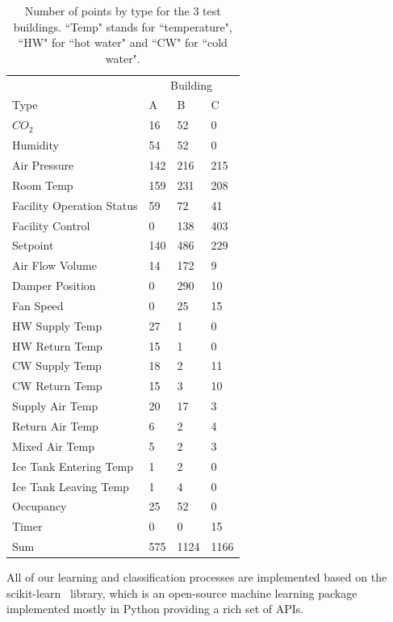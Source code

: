 \begin{table}[t]
\centering
\begin{tabular}{l | l l l}
\hline
& \multicolumn{3}{c}{Building} \\
Type & A & B & C\\
\hline\hline
$CO_{2}$ & 16 & 52 & 0\\
Humidity & 54 & 52 & 0\\
Air Pressure & 142 & 216 & 215\\
Room Temp & 159 & 231 & 208\\
Facility Operation Status & 59 & 72 & 41\\
Facility Control & 0 & 138 & 403\\
Setpoint & 140 & 486 & 229\\
Air Flow Volume & 14 & 172 & 9\\
Damper Position & 0 & 290 & 10\\
Fan Speed & 0 & 25 & 15\\
HW Supply Temp & 27 & 1 & 0\\
HW Return Temp & 15 & 1 & 0\\
CW Supply Temp & 18 & 2 & 11\\
CW Return Temp & 15 & 3 & 10\\
Supply Air Temp & 20 & 17 & 3\\
Return Air Temp & 6 & 2 & 4\\
Mixed Air Temp & 5 & 2 & 3\\
Ice Tank Entering Temp & 1 & 2 & 0\\
Ice Tank Leaving Temp & 1 & 4 & 0\\
Occupancy & 25 & 52 & 0\\
Timer & 0 & 0 & 15\\ \hline
Sum & 575 & 1124 & 1166\\ \hline
\end{tabular}
\caption{Number of points by type for the 3 test buildings. ``Temp" stands for ``temperature", ``HW" for ``hot water" and ``CW" for ``cold water".}
\label{table:num}
\end{table}


All of our learning and classification processes are implemented based on the scikit-learn~\cite{scikit} library, which is an open-source machine learning package 
implemented mostly in Python providing a rich set of APIs.



